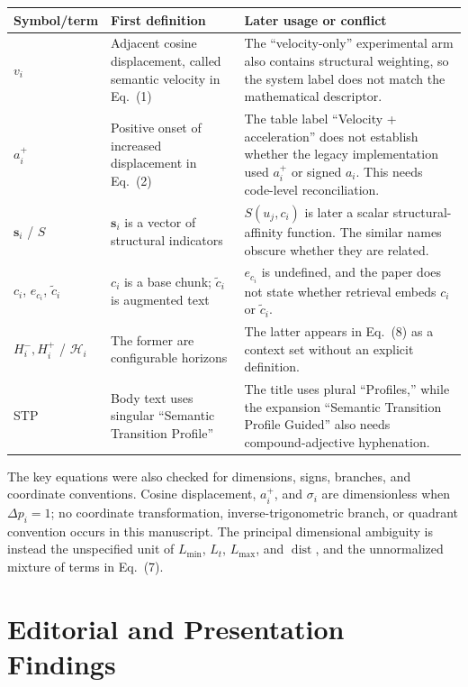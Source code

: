 \documentclass[11pt]{article}
\begin{document}
\begin{tabularx}{\textwidth}{@{}p{}p{}X@{}}
\toprule
Symbol/term & First definition & Later usage or conflict \\
\midrule
$v_i$ & Adjacent cosine displacement, called semantic velocity in Eq.~(1) & The ``velocity-only'' experimental arm also contains structural weighting, so the system label does not match the mathematical descriptor. \\
$a_i^+$ & Positive onset of increased displacement in Eq.~(2) & The table label ``Velocity + acceleration'' does not establish whether the legacy implementation used $a_i^+$ or signed $a_i$. This needs code-level reconciliation. \\
$\mathbf{s}_i$ / $S$ & $\mathbf{s}_i$ is a vector of structural indicators & $S(u_j,c_i)$ is later a scalar structural-affinity function. The similar names obscure whether they are related. \\
$c_i$, $e_{c_i}$, $\tilde c_i$ & $c_i$ is a base chunk; $\tilde c_i$ is augmented text & $e_{c_i}$ is undefined, and the paper does not state whether retrieval embeds $c_i$ or $\tilde c_i$. \\
$H_i^-,H_i^+$ / $\mathcal H_i$ & The former are configurable horizons & The latter appears in Eq.~(8) as a context set without an explicit definition. \\
STP & Body text uses singular ``Semantic Transition Profile'' & The title uses plural ``Profiles,'' while the expansion ``Semantic Transition Profile Guided'' also needs compound-adjective hyphenation. \\
\bottomrule
\end{tabularx}

The key equations were also checked for dimensions, signs, branches, and coordinate conventions. Cosine displacement, $a_i^+$, and $\sigma_i$ are dimensionless when $\Delta p_i=1$; no coordinate transformation, inverse-trigonometric branch, or quadrant convention occurs in this manuscript. The principal dimensional ambiguity is instead the unspecified unit of $L_{\min}$, $L_t$, $L_{\max}$, and $\operatorname{dist}$, and the unnormalized mixture of terms in Eq.~(7).

\section*{Editorial and Presentation Findings}
\end{document}
